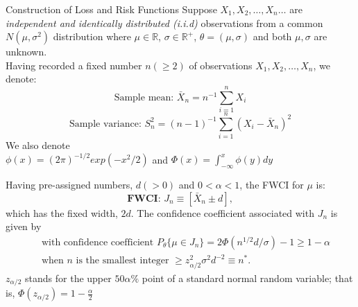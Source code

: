 \documentclass [xcolor=svgnames, t] {beamer}
\begin{document}


\begin{frame}{Construction of Loss and Risk Functions}
    Suppose $X_1,X_2, \dots ,X_n \dots$ are \textit{independent and identically distributed (i.i.d)} observations from a common $N(\mu,\sigma^2)$ distribution where $\mu \in \mathbb{R}$, $\sigma \in \mathbb{R}^{+}$, $\theta=(\mu,\sigma)$ and both $\mu,\sigma$ are unknown. \\
    \vspace{2mm}
    Having recorded a fixed number $n (\geq 2)$ of observations $X_1,X_2,\dots,X_n$, we denote:
    $$\text{Sample mean: }\bar{X}_n=n^{-1}\sum_{i=1}^nX_i$$
    $$\text{Sample variance: }S_n^2=(n-1)^{-1}\sum_
    {i=1}^n {(X_i-\bar{X}_n)^2}$$
    \vspace{0.1cm}
    We also denote \\
    $\phi(x)=(2\pi)^{-1/2}exp(-x^2/2)$ and $\Phi(x) = \int_{-\infty}^{x} \phi(y) dy $
    
    \end{frame}

    
 \begin{frame}{}
    \vspace{7mm}

    
    Having pre-assigned numbers, $d(>0)$ and $0<\alpha<1$, the FWCI for $\mu$ is:
        $$\textbf{FWCI: } J_n \equiv \left[ \bar{X}_n \pm d\right],$$
        which  has the fixed width, $2d$. The confidence coefficient associated with $J_n$ is given by
        \begin{equation} \label{opt_n} 
        \begin{split}
        & \text{ with confidence coefficient }P_{\theta}\{\mu \in J_n\} = 2\Phi(n^{1/2}d/\sigma)-1  \ge 1-\alpha \\
        & \text{ when } n \text{ is the smallest integer } \ge z^2_{\alpha/2}\sigma^2 d^{-2} \equiv n^*.
        \end{split}
        \end{equation}
        $z_{\alpha/2}$ stands for the upper $50 \alpha \%$ point of a standard normal random variable; that is, $\Phi(z_{\alpha/2})=1-\frac{\alpha}{2}$

\end{frame}
\end{document}
